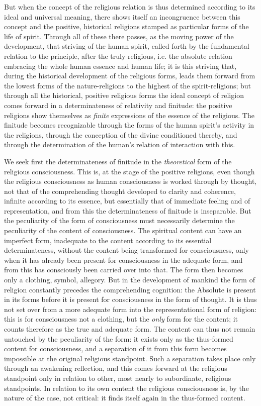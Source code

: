 \documentclass[12pt,a4paper]{book}
\begin{document}
But when the concept of the religious relation is thus determined according to
its ideal and universal meaning, there shows itself an incongruence between this
concept and the positive, historical religions stamped as particular forms of
the life of spirit. Through all of these there passes, as the moving power of
the development, that striving of the human spirit, called forth by the
fundamental relation to the principle, after the truly religious, i.e. the
absolute relation embracing the whole human essence and human life; it is this
striving that, during the historical development of the religious forms, leads
them forward from the lowest forms of the nature-religions to the highest of the
spirit-religions; but through all the historical, positive religious forms the
ideal concept of religion comes forward in a determinateness of relativity and
finitude: the positive religions show themselves as \emph{finite} expressions of
the essence of the religious. The finitude becomes recognizable through the
forms of the human spirit's activity in the religions, through the conception of
the divine conditioned thereby, and through the determination of the human's
relation of interaction with this.

We seek first the determinateness of finitude in the \emph{theoretical} form of
the religious consciousness. This is, at the stage of the positive religions,
even though the religious consciousness as human consciousness is worked through
by thought, not that of the comprehending thought developed to clarity and
coherence, infinite according to its essence, but essentially that of immediate
feeling and of representation, and from this the determinateness of finitude is
inseparable. But the peculiarity of the form of consciousness must necessarily
determine the peculiarity of the content of consciousness. The spiritual content
can have an imperfect form, inadequate to the content according to its
essential determinateness, without the content being transformed for
consciousness, only when it has already been present for consciousness in the
adequate form, and from this has consciously been carried over into that. The
form then becomes only a clothing, symbol, allegory. But in the development of
mankind the form of religion constantly precedes the comprehending cognition:
the Absolute is present in its forms before it is present for consciousness in
the form of thought. It is thus not set over from a more adequate form into the
representational form of religion: this is for consciousness not a clothing, but
the \emph{only} form for the content; it counts therefore as the true and
adequate form. The content can thus not remain untouched by the peculiarity of
the form: it exists only as the thus-formed content for consciousness, and a
separation of it from this form becomes impossible at the original religious
standpoint. Such a separation takes place only through an awakening reflection,
and this comes forward at the religious standpoint only in relation to other,
most nearly to subordinate, religious standpoints. In relation to its own content
the religious consciousness is, by the nature of the case, not critical: it
finds itself again in the thus-formed content.
\end{document}
